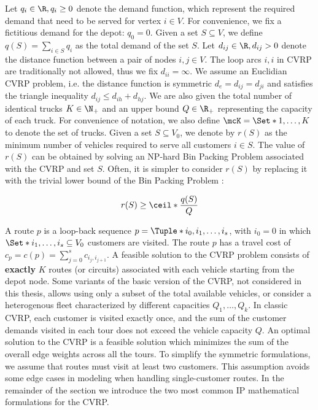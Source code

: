 Let $q_{i} \in \R, q_{i} \ge 0$ denote the demand function, which represent the required demand that need to be served for vertex $i \in V$.
For convenience, we fix a fictitious demand for the depot: $q_0 = 0$.
Given a set $S \subseteq V$, we define $q(S) = \sum_{i \in S} q_i$ as the total demand of the set $S$.
Let $d_{ij} \in \R, d_{ij} > 0$ denote the distance function between a pair of nodes  $i, j \in V$.
The loop arcs ${i, i}$ in CVRP are traditionally not allowed, thus we fix $d_{ii} = \infty$.
We assume an Euclidian CVRP problem, i.e. the distance function is symmetric $d_e = d_{ij} = d_{ji}$ and satisfies the triangle inequality $d_{ij} \le d_{ih} + d_{hj}$.
We are also given the total number of identical trucks $K \in \N_+$ and an upper bound $Q \in \R_+$ representing the capacity of each truck.
For convenience of notation, we also define $\mcK = \Set*{1, \dots, K}$ to denote the set of trucks.
Given a set $S \subseteq V_0$, we denote by $r(S)$ as the minimum number of vehicles required to serve all customers $i \in S$.
The value of $r(S)$ can be obtained by solving an NP-hard Bin Packing Problem associated with the CVRP and set $S$.
Often, it is simpler to consider $r(S)$ by replacing it with the trivial lower bound of the Bin Packing Problem \parencite{martello1990}:

\begin{equation}
	r(S) \ge \ceil*{\frac{q(S)}{Q}}
\end{equation}

A route $p$ is a loop-back sequence $p = \Tuple*{i_0, i_1, \dots, i_s}$, with $i_0 = 0$ in which
$\Set*{i_1, \dots, i_s} \subseteq V_0$ customers are visited.
The route $p$ has a travel cost of $c_p = c(p) = \sum_{j=0}^s c_{i_j,i_{j+1}}$.
A feasible solution to the CVRP problem consists of \textbf{exactly} $K$ routes (or circuits) associated with each vehicle starting from the depot node.
Some variants of the basic version of the CVRP, not considered in this thesis, allows using only a subset of the total available vehicles,
or consider a heterogenous fleet characterized by different capacities $Q_1, \dots, Q_k$.
In classic CVRP, each customer is visited exactly once, and the sum of the customer demands visited in each tour does not exceed the vehicle capacity $Q$.
An optimal solution to the CVRP is a feasible solution which minimizes the sum of the overall edge weights across all the tours.
To simplify the symmetric formulations, we assume that routes must visit at least two customers.
This assumption avoids some edge cases in modeling when handling single-customer routes.
In the remainder of the section we introduce the two most common IP mathematical formulations for the CVRP.

